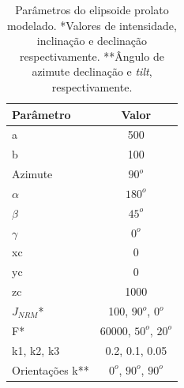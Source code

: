 \begin{table}[h]
	\begin{center}
		\begin{tabular}{|l|c|}
			\hline
			\textbf{Parâmetro}  & \textbf{Valor}  \\
			\hline 
			a   & 500 \\
			\hline
			b   & 100  \\
			\hline
			Azimute   & $90^o$ \\
			\hline
			$\alpha$    & $180^o$   \\
			\hline
			$\beta$    & $45^o$ \\
			\hline
			$\gamma$   & $0^o$  \\
			\hline
			xc   & 0  \\
			\hline          
			yc   & 0  \\
			\hline                
			zc   & 1000  \\
			\hline
			$J_{NRM}$*  & 100, $90^o$, $0^o$  \\
			\hline
			F*    & 60000, $50^o$, $20^o$ \\
			\hline
			k1, k2, k3   & 0.2, 0.1, 0.05  \\
			\hline
			Orientações k**   & $0^o$, $90^o$, $90^o$  \\
			\hline
		\end{tabular}
		\caption{Parâmetros do elipsoide prolato modelado. *Valores de intensidade, inclinação e declinação respectivamente. **Ângulo de azimute
			declinação e \textit{tilt}, respectivamente.}
	\end{center}
	\label{tab:triaxial_prolate2}
\end{table}

